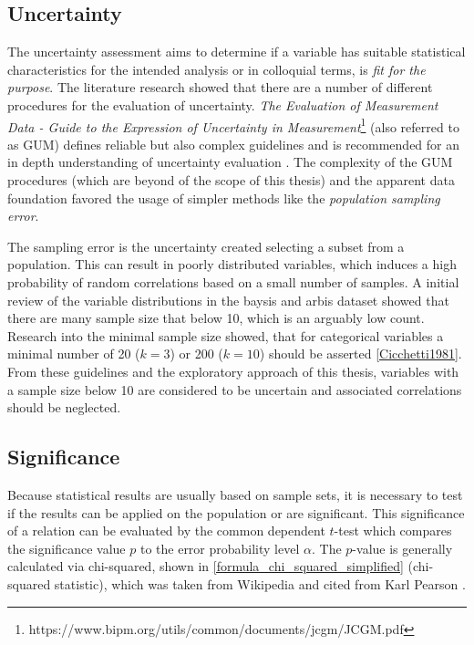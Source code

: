 \subsection{Uncertainty}
\label{correlation_uncertainty}
The uncertainty assessment aims to determine if a variable has suitable statistical characteristics for the intended analysis or in colloquial terms, is \textit{fit for the purpose}. The literature research showed that there are a number of different procedures for the evaluation of uncertainty. \textit{The Evaluation of Measurement Data - Guide to the Expression of Uncertainty in Measurement}\footnote{https://www.bipm.org/utils/common/documents/jcgm/JCGM.pdf} (also referred to as GUM) defines reliable but also complex guidelines and is recommended for an in depth understanding of uncertainty evaluation \parencite{Farrance2012}. The complexity of the GUM procedures (which are beyond of the scope of this thesis) and the apparent data foundation favored the usage of simpler methods like the \textit{population sampling error}. \parencite{ONS2020}

The sampling error is the uncertainty created selecting a subset from a population. This can result in poorly distributed variables, which induces a high probability of random correlations based on a small number of samples. A initial review of the variable distributions in the \acrshort{baysis} and \acrshort{arbis} dataset showed that there are many  sample size that below 10, which is an arguably low count. Research into the minimal sample size showed, that for categorical variables a minimal number of 20 ($k=3$) or 200 ($k=10$) should be asserted \cref{Cicchetti1981}. From these guidelines and the exploratory approach of this thesis, variables with a sample size below 10 are considered to be uncertain and associated correlations should be neglected.


\subsection{Significance}
\label{correlation_significance}
Because statistical results are usually based on sample sets, it is necessary to test if the results can be applied on the population or are significant. This significance of a relation can be evaluated by the common dependent $t$-test which compares the significance value $p$ to the error probability level $\alpha$. The $p$-value is generally calculated via chi-squared, shown in \cref{formula_chi_squared_simplified} (chi-squared statistic), which was taken from Wikipedia and cited from Karl Pearson \parencite{Pearson1990}.

